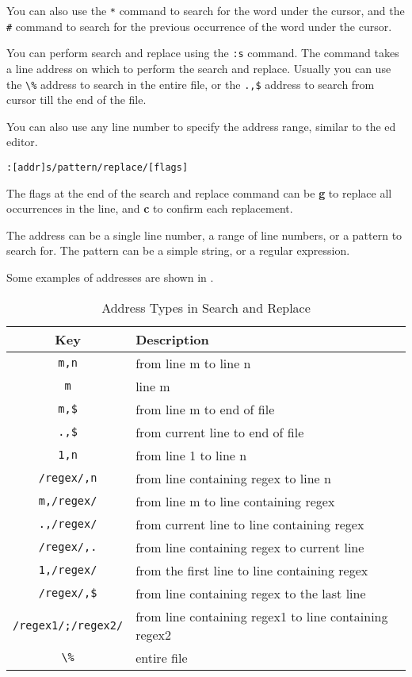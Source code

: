 You can also use the \lstinline|*| command to search for the word
under the cursor, and the \lstinline|#| command to search for the
previous occurrence of the word under the cursor.

You can perform search and replace using the \lstinline|:s| command.
The command takes a line address on which to perform the search
and replace. Usually you can use the \lstinline|\%| address to
search in the entire file, or the \lstinline|.,$| address to
search from cursor till the end of the file.

You can also use any line number to specify the address range,
similar to the ed editor.

\begin{lstlisting}
:[addr]s/pattern/replace/[flags]
\end{lstlisting}

The flags at the end of the search and replace command can be
\textbf{g} to replace all occurrences in the line, and
\textbf{c} to confirm each replacement.

The address can be a single line number, a range of line numbers,
or a pattern to search for. The pattern can be a simple string,
or a regular expression.

Some examples of addresses are shown in .

\begin{table*}[h!]
  \caption{Address Types in Search and Replace}
  \begin{tabular}{c l}
    \toprule
    Key & Description \\
    \midrule
    \lstinline|m,n| & from line m to line n \\
    \lstinline|m| & line m \\
    \lstinline|m,$| & from line m to end of file \\
    \lstinline|.,$| & from current line to end of file \\
    \lstinline|1,n| & from line 1 to line n \\
    \lstinline|/regex/,n| & from line containing regex to line n \\
    \lstinline|m,/regex/| & from line m to line containing regex \\
    \lstinline|.,/regex/| & from current line to line containing regex \\
    \lstinline|/regex/,.| & from line containing regex to current line \\
    \lstinline|1,/regex/| & from the first line to line containing regex \\
    \lstinline|/regex/,$| & from line containing regex to the last line \\
    \lstinline|/regex1/;/regex2/| & from line containing regex1 to line containing regex2 \\
    \lstinline|\%| & entire file \\
    \bottomrule
  \end{tabular}
\end{table*}

